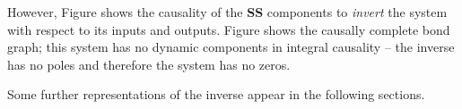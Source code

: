 However, Figure  shows the causality of the
\textbf{SS} components to \emph{invert} the system with respect to its
inputs and outputs. Figure  shows the causally
complete bond graph; this system has no dynamic components in integral
causality -- the inverse has no poles and therefore the system has no
zeros.

Some further representations of the inverse appear in the following
sections.


